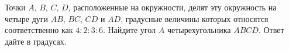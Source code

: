 \begin{ex}
	\begin{condition}
		Точки \( A \), \( B \), \( C \), \( D \), расположенные на окружности, делят эту окружность на четыре дуги \( AB \), \( BC \), \( CD  \) и \( AD \), градусные величины которых относятся соответственно как \( 4:2:3:6 \). Найдите угол \( A  \) четырехугольника \( ABCD \). Ответ дайте в градусах.
	\end{condition}
\end{ex}